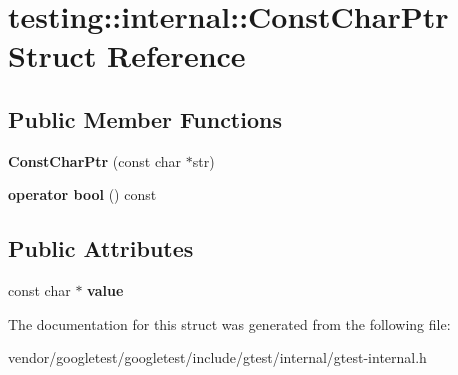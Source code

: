 \hypertarget{structtesting_1_1internal_1_1_const_char_ptr}{}\section{testing\+:\+:internal\+:\+:Const\+Char\+Ptr Struct Reference}
\label{structtesting_1_1internal_1_1_const_char_ptr}
\subsection*{Public Member Functions}
\begin{DoxyCompactItemize}
\item 
\mbox{\label{structtesting_1_1internal_1_1_const_char_ptr_ae94f6453fa679d815994eccc63062907}} 
{\bfseries Const\+Char\+Ptr} (const char $\ast$str)
\item 
\mbox{\label{structtesting_1_1internal_1_1_const_char_ptr_a85c8174b5d4db8fe96863509ba767b27}} 
{\bfseries operator bool} () const
\end{DoxyCompactItemize}
\subsection*{Public Attributes}
\begin{DoxyCompactItemize}
\item 
\mbox{\label{structtesting_1_1internal_1_1_const_char_ptr_adba40d23d5986904b605946f643cf26e}} 
const char $\ast$ {\bfseries value}
\end{DoxyCompactItemize}


The documentation for this struct was generated from the following file\+:\begin{DoxyCompactItemize}
\item 
vendor/googletest/googletest/include/gtest/internal/gtest-\/internal.\+h\end{DoxyCompactItemize}
